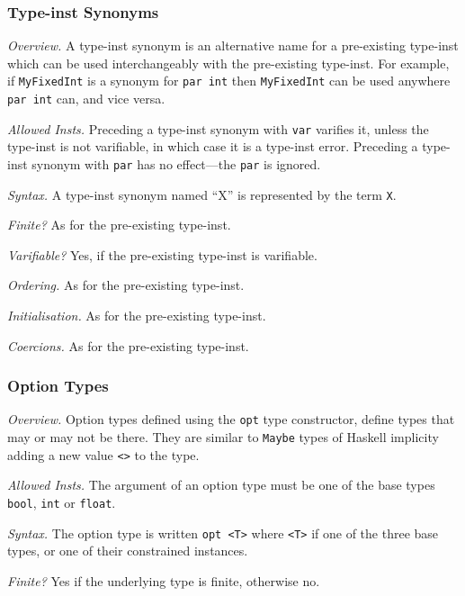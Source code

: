 \documentclass[10pt]{scrartcl}
\newcommand{\TyThing}[1]{\vspace{1.2mm}\noindent\emph{#1} }
\newcommand{\TyOverview}{\TyThing{Overview.}}
\newcommand{\TyInsts}{\TyThing{Allowed Insts.}}
\newcommand{\TySyntax}{\TyThing{Syntax.}}
\newcommand{\TyFiniteType}{\TyThing{Finite?}}
\newcommand{\TyVarifiable}{\TyThing{Varifiable?}}
\newcommand{\TyOrdering}{\TyThing{Ordering.}}
\newcommand{\TyInit}{\TyThing{Initialisation.}}
\newcommand{\TyCoercions}{\TyThing{Coercions.}}
\begin{document}
{%
\subsubsection{Type-inst Synonyms}
        \label{Type-inst Synonyms}
\TyOverview
A type-inst synonym is an alternative name for a pre-existing type-inst
which can be used interchangeably with the pre-existing type-inst.
For example, if \texttt{MyFixedInt} is a synonym for \texttt{par int} then
\texttt{MyFixedInt} can be used anywhere \texttt{par int} can, and vice versa.

\TyInsts
Preceding a type-inst synonym with \texttt{var} varifies it, unless the
type-inst is not varifiable, in which case it is a type-inst error.
Preceding a type-inst synonym with \texttt{par} has no effect---the
\texttt{par} is ignored.

\TySyntax
A type-inst synonym named ``X'' is represented by the term \texttt{X}.

\TyFiniteType
As for the pre-existing type-inst.

\TyVarifiable
Yes, if the pre-existing type-inst is varifiable.

\TyOrdering
As for the pre-existing type-inst.

\TyInit
As for the pre-existing type-inst.

\TyCoercions
As for the pre-existing type-inst.
}

\subsubsection{Option Types}
        \label{option types}
\TyOverview
Option types defined using the \texttt{opt} type constructor, define types
that may or may not be there. They are similar to \texttt{Maybe} types of
Haskell implicity adding a new value \texttt{<>} to the type.


\TyInsts
The argument of an option type must be one of the base types
\texttt{bool}, \texttt{int} or \texttt{float}.

\TySyntax
The option type is written \texttt{opt <T>} where \texttt{<T>} if one of
the three base types, or one of their constrained instances.

\TyFiniteType
Yes if the underlying type is finite, otherwise no.
\end{document}
